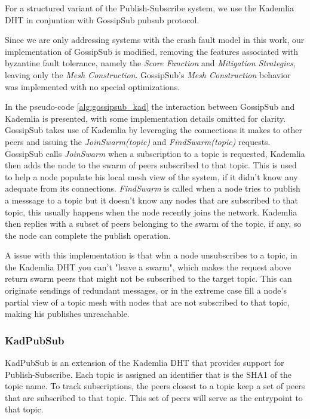 \documentclass[sigconf]{acmart}
\begin{document}
For a structured variant of the Publish-Subscribe system, we use the Kademlia DHT in conjuntion with GossipSub pubsub protocol.

Since we are only addressing systems with the crash fault model in this work, our implementation of GossipSub is modified, removing the features associated with byzantine fault tolerance, namely the \textit{Score Function} and \textit{Mitigation Strategies}, leaving only the \textit{Mesh Construction}. GossipSub's \textit{Mesh Construction} behavior was implemented with no special optimizations. 

In the pseudo-code \ref{alg:gossipsub_kad} the interaction between GossipSub and Kademlia is presented, with some implementation details omitted for clarity. GossipSub takes use of Kademlia by leveraging the connections it makes to other peers and issuing the \textit{JoinSwarm(topic)} and \textit{FindSwarm(topic)} requests. 
GossipSub calls \textit{JoinSwarm} when a subscription to a topic is requested, Kademlia then adds the node to the swarm of peers subscribed to that topic. This is used to help a node populate his local mesh view of the system, if it didn't know any adequate from its connections.  
\textit{FindSwarm} is called when a node tries to publish a messsage to a topic but it doesn't know any nodes that are subscribed to that topic, this usually happens when the node recently joins the network. Kademlia then replies with a subset of peers belonging to the swarm of the topic, if any, so the node can complete the publish operation.

A issue with this implementation is that whn a node unsubscribes to a topic, in the Kademlia DHT you can't "leave a swarm", which makes the request above return swarm peers that might not be subscribed to the target topic. This can originate sendings of redundant messages, or in the extreme case fill a node's partial view of a topic mesh with nodes that are not subscribed to that topic, making his publishes unreachable.

\subsubsection{KadPubSub}
KadPubSub is an extension of the Kademlia DHT that provides support for Publish-Subscribe.
Each topic is assigned an identifier that is the SHA1 of the topic name.
To track subscriptions, the peers closest to a topic keep a set of peers that are subscribed to that topic. This set of peers will serve as the entrypoint to that topic.
\end{document}
